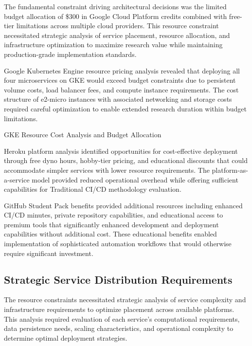 The fundamental constraint driving architectural decisions was the limited budget allocation of \$300 in Google Cloud Platform credits combined with free-tier limitations across multiple cloud providers. This resource constraint necessitated strategic analysis of service placement, resource allocation, and infrastructure optimization to maximize research value while maintaining production-grade implementation standards.

Google Kubernetes Engine resource pricing analysis revealed that deploying all four microservices on GKE would exceed budget constraints due to persistent volume costs, load balancer fees, and compute instance requirements. The cost structure of e2-micro instances with associated networking and storage costs required careful optimization to enable extended research duration within budget limitations.

\begin{table}[H]
\centering
\caption{GKE Resource Cost Analysis and Budget Allocation}
\label{tab:gke-budget-analysis}
\end{table}

Heroku platform analysis identified opportunities for cost-effective deployment through free dyno hours, hobby-tier pricing, and educational discounts that could accommodate simpler services with lower resource requirements. The platform-as-a-service model provided reduced operational overhead while offering sufficient capabilities for Traditional CI/CD methodology evaluation.

GitHub Student Pack benefits provided additional resources including enhanced CI/CD minutes, private repository capabilities, and educational access to premium tools that significantly enhanced development and deployment capabilities without additional cost. These educational benefits enabled implementation of sophisticated automation workflows that would otherwise require significant investment.

\subsection{Strategic Service Distribution Requirements}

The resource constraints necessitated strategic analysis of service complexity and infrastructure requirements to optimize placement across available platforms. This analysis required evaluation of each service's computational requirements, data persistence needs, scaling characteristics, and operational complexity to determine optimal deployment strategies.

